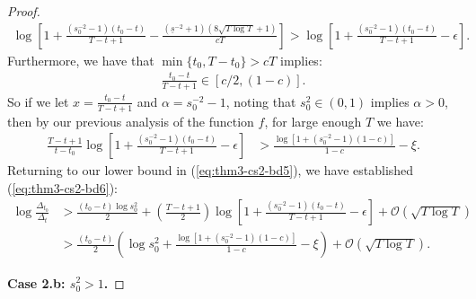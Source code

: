 \documentclass{article}
\begin{document}
\begin{proof}
\begin{align*}
     \log\left[1 + \frac{\left(s_0^{-2} -1\right)(t_0 - t)}{T - t + 1} -  \frac{(\underline{s}^{-2} + 1)\left(8\sqrt{T\log T} +1\right)}{cT}\right] > \log\left[1 + \frac{\left(s_0^{-2} -1\right)(t_0 - t)}{T - t + 1} - \epsilon\right].
\end{align*}
Furthermore, we have that $\min\{t_0,T-t_0\} > cT$ implies: 
\begin{align*}
    \frac{t_0 - t}{T - t + 1} \in [c/2, (1-c)].
\end{align*}
So if we let $x = \frac{t_0 - t}{T - t + 1}$ and $\alpha = s_0^{-2} -1$, noting that $s_0^{2}  \in (0,1)$ implies $\alpha > 0$, then by our previous analysis of the function $f$, for large enough $T$ we have:
\begin{align*}
    \frac{T-t+1}{t-t_0}\log\left[1 + \frac{\left(s_0^{-2} -1\right)(t_0 - t)}{T - t + 1} - \epsilon\right] &> \frac{\log[1 +  (s_0^{-2} -1)(1-c)]}{1-c} - \xi.
\end{align*}
Returning to our lower bound in (\ref{eq:thm3-cs2-bd5}), we have established (\ref{eq:thm3-cs2-bd6}):
\begin{align*}
    \log \frac{\Delta_{t_0}}{\Delta_t} &> \frac{(t_0 - t)\log s_0^2}{2} + \left(\frac{T - t + 1}{2}\right)\log\left[1 + \frac{\left(s_0^{-2} -1\right)(t_0 - t)}{T - t + 1} - \epsilon\right] + \mathcal{O}(\sqrt{T \log T}) \\
    &> \frac{(t_0 - t)}{2} \left(\log s_0^2 + \frac{\log[1 +  (s_0^{-2} -1)(1-c)]}{1-c} - \xi\right)  + \mathcal{O}(\sqrt{T \log T}).
\end{align*}

\textbf{Case 2.b: $s_0^2 > 1$.}


\end{proof}
\end{document}
